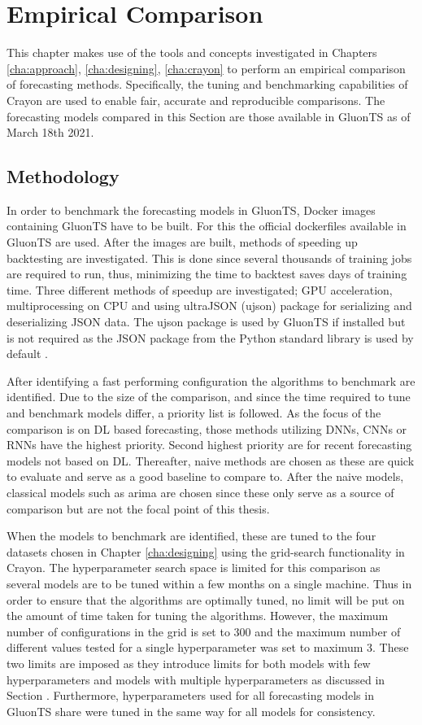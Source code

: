 \chapter{Empirical Comparison\label{cha:chapter6}}

This chapter makes use of the tools and concepts investigated in Chapters \ref{cha:approach}, \ref{cha:designing}, \ref{cha:crayon} to perform an empirical comparison of forecasting methods. Specifically, the tuning and benchmarking capabilities of Crayon are used to enable fair, accurate and reproducible comparisons. The forecasting models compared in this Section are those available in GluonTS as of March 18th 2021.


\section{Methodology}
In order to benchmark the forecasting models in GluonTS, Docker images containing GluonTS have to be built. For this the official dockerfiles available in GluonTS are used.  After the images are built, methods of speeding up backtesting are investigated. This is done since several thousands of training jobs are required to run, thus, minimizing the time to backtest saves days of training time. Three different methods of speedup are investigated; GPU acceleration, multiprocessing on CPU and using ultraJSON (ujson) package for serializing and deserializing JSON data. The ujson package is used by GluonTS if installed but is not required as the JSON package from the Python standard library is used by default \cite{gluonts-github}.

After identifying a fast performing configuration the algorithms to benchmark are identified. Due to the size of the comparison, and since the time required to tune and benchmark models differ, a priority list is followed. As the focus of the comparison is on DL based forecasting, those methods utilizing DNNs, CNNs or RNNs have the highest priority. Second highest priority are for recent forecasting models not based on DL. Thereafter, naive methods are chosen as these are quick to evaluate and serve as a good baseline to compare to. After the naive models, classical models such as arima are chosen since these only serve as a source of comparison but are not the focal point of this thesis.

When the models to benchmark are identified, these are tuned to the four datasets chosen in Chapter \ref{cha:designing} using the grid-search functionality in Crayon. The hyperparameter search space is limited for this comparison as several models are to be tuned within a few months on a single machine. Thus in order to ensure that the algorithms are optimally tuned, no limit will be put on the amount of time taken for tuning the algorithms. However, the maximum number of configurations in the grid is set to 300 and the maximum number of different values tested for a single hyperparameter was set to maximum 3. These two limits are imposed as they introduce limits for both models with few hyperparameters and models with multiple hyperparameters as discussed in Section \cite{dockerhub_arangatang}. Furthermore, hyperparameters used for all forecasting models in GluonTS share were tuned in the same way for all models for consistency.

